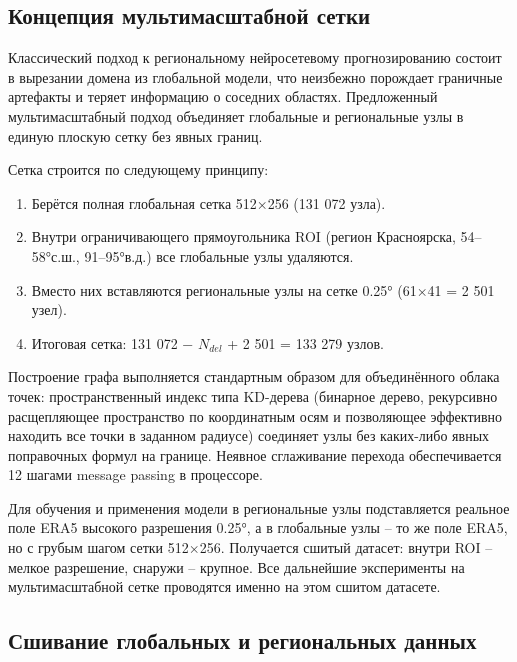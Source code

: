 \documentclass[14pt,a4paper]{extarticle}
\numberwithin{table}{section}
\numberwithin{figure}{section}
\numberwithin{equation}{section}
\providecommand{\tightlist}{%
  \setlength{\itemsep}{0pt}\setlength{\parskip}{0pt}}
\begin{document}
\subsection{Концепция мультимасштабной сетки}\label{ux43aux43eux43dux446ux435ux43fux446ux438ux44f-ux43cux443ux43bux44cux442ux438ux440ux435ux437ux43eux43bux44eux446ux438ux43eux43dux43dux43eux439-ux441ux435ux442ux43aux438}

Классический подход к региональному нейросетевому прогнозированию
состоит в вырезании домена из глобальной модели, что неизбежно порождает
граничные артефакты и теряет информацию о соседних областях.
Предложенный мультимасштабный подход объединяет глобальные и
региональные узлы в единую плоскую сетку без явных границ.

Сетка строится по следующему принципу:

\begin{enumerate}
\def\labelenumi{\arabic{enumi}.}
\tightlist
\item
  Берётся полная глобальная сетка 512×256 (131 072 узла).
\item
  Внутри ограничивающего прямоугольника ROI (регион Красноярска,
  54--58°с.ш., 91--95°в.д.) все глобальные узлы удаляются.
\item
  Вместо них вставляются региональные узлы на сетке 0.25° (61×41 = 2 501
  узел).
\item
  Итоговая сетка: 131 072 − \(N_{del}\) + 2 501 = 133 279
  узлов.
\end{enumerate}

Построение графа выполняется стандартным образом для объединённого
облака точек: пространственный индекс типа KD-дерева (бинарное дерево,
рекурсивно расщепляющее пространство по координатным осям и позволяющее
эффективно находить все точки в заданном радиусе) соединяет узлы без
каких-либо явных поправочных формул на границе. Неявное сглаживание
перехода обеспечивается 12 шагами message passing в процессоре.

Для обучения и применения модели в региональные узлы подставляется реальное
поле ERA5 высокого разрешения 0.25°, а в глобальные узлы --
то же поле ERA5, но с грубым шагом сетки 512$\times$256. Получается
сшитый датасет: внутри ROI -- мелкое разрешение,
снаружи -- крупное. Все дальнейшие эксперименты на
мультимасштабной сетке проводятся именно на этом сшитом датасете.

\subsection{Сшивание глобальных и региональных данных}\label{ux441ux448ux438ux432ux430ux43dux438ux435-ux433ux43bux43eux431ux430ux43bux44cux43dux44bux445-ux438-ux440ux435ux433ux438ux43eux43dux430ux43bux44cux43dux44bux445-ux434ux430ux43dux43dux44bux445}
\end{document}
